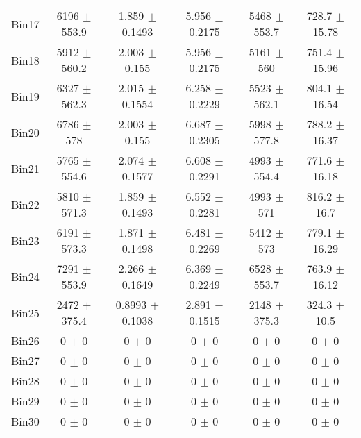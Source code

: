 \begin{tabular}{@{\extracolsep{4pt}}lccccc@{}}
     Bin17 & 6196 $\pm$ 553.9 & 1.859 $\pm$ 0.1493 & 5.956 $\pm$ 0.2175 & 5468 $\pm$ 553.7 & 728.7 $\pm$ 15.78 \\ 
     Bin18 & 5912 $\pm$ 560.2 & 2.003 $\pm$ 0.155 & 5.956 $\pm$ 0.2175 & 5161 $\pm$ 560 & 751.4 $\pm$ 15.96 \\ 
     Bin19 & 6327 $\pm$ 562.3 & 2.015 $\pm$ 0.1554 & 6.258 $\pm$ 0.2229 & 5523 $\pm$ 562.1 & 804.1 $\pm$ 16.54 \\ 
     Bin20 & 6786 $\pm$ 578 & 2.003 $\pm$ 0.155 & 6.687 $\pm$ 0.2305 & 5998 $\pm$ 577.8 & 788.2 $\pm$ 16.37 \\ 
     Bin21 & 5765 $\pm$ 554.6 & 2.074 $\pm$ 0.1577 & 6.608 $\pm$ 0.2291 & 4993 $\pm$ 554.4 & 771.6 $\pm$ 16.18 \\ 
     Bin22 & 5810 $\pm$ 571.3 & 1.859 $\pm$ 0.1493 & 6.552 $\pm$ 0.2281 & 4993 $\pm$ 571 & 816.2 $\pm$ 16.7 \\ 
     Bin23 & 6191 $\pm$ 573.3 & 1.871 $\pm$ 0.1498 & 6.481 $\pm$ 0.2269 & 5412 $\pm$ 573 & 779.1 $\pm$ 16.29 \\ 
     Bin24 & 7291 $\pm$ 553.9 & 2.266 $\pm$ 0.1649 & 6.369 $\pm$ 0.2249 & 6528 $\pm$ 553.7 & 763.9 $\pm$ 16.12 \\ 
     Bin25 & 2472 $\pm$ 375.4 & 0.8993 $\pm$ 0.1038 & 2.891 $\pm$ 0.1515 & 2148 $\pm$ 375.3 & 324.3 $\pm$ 10.5 \\ 
     Bin26 & 0 $\pm$ 0 & 0 $\pm$ 0 & 0 $\pm$ 0 & 0 $\pm$ 0 & 0 $\pm$ 0 \\ 
     Bin27 & 0 $\pm$ 0 & 0 $\pm$ 0 & 0 $\pm$ 0 & 0 $\pm$ 0 & 0 $\pm$ 0 \\ 
     Bin28 & 0 $\pm$ 0 & 0 $\pm$ 0 & 0 $\pm$ 0 & 0 $\pm$ 0 & 0 $\pm$ 0 \\ 
     Bin29 & 0 $\pm$ 0 & 0 $\pm$ 0 & 0 $\pm$ 0 & 0 $\pm$ 0 & 0 $\pm$ 0 \\ 
     Bin30 & 0 $\pm$ 0 & 0 $\pm$ 0 & 0 $\pm$ 0 & 0 $\pm$ 0 & 0 $\pm$ 0 \\ 
\hline\hline
  \end{tabular}
